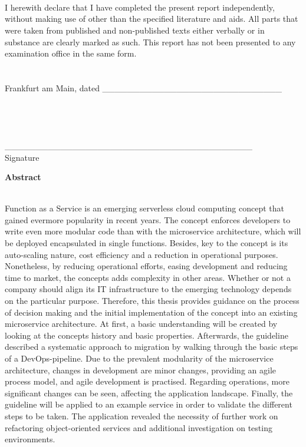 \documentclass[a4paper,11pt, pagesize]{scrartcl}
\begin{document}
\begin{spacing}{1.2}
\begin{flushleft}
\end{flushleft}
~\\\\\\
I herewith declare that I have completed the present report independently, without making use of other than the specified literature and aids. All parts that were taken from published and non-published texts either verbally or in substance are clearly marked as such.  This report has not been presented to any examination office in the same form.  \\\\\\
Frankfurt am Main, dated  \_\_\_\_\_\_\_\_\_\_\_\_\_\_\_\_\_\_\_\_\_\_\_\_\_\_\_\_\_    
\\\\\\\\\\
\_\_\_\_\_\_\_\_\_\_\_\_\_\_\_\_\_\_\_\_\_\_\_\_\_\_\_\_\_\_\_\_\_\_\_\_\_\_\_\_\\Signature 
\newpage
\begin{flushleft}
  {\Large \textbf {Abstract}}\\\\
\end{flushleft}
Function as a Service is an emerging serverless cloud computing concept that gained evermore popularity in recent years. The concept enforces developers to write even more modular code than with the microservice architecture, which will be deployed encapsulated in single functions. Besides, key to the concept is its auto-scaling nature, cost efficiency and a reduction in operational purposes. Nonetheless, by reducing operational efforts, easing development and reducing time to market, the concepts adds complexity in other areas. Whether or not a company should align its IT infrastructure to the emerging technology depends on the particular purpose. Therefore, this thesis provides guidance on the process of decision making and the initial implementation of the concept into an existing microservice architecture. At first, a basic understanding will be created by looking at the concepts history and basic properties. Afterwards, the guideline described a systematic approach to migration by walking through the basic steps of a DevOps-pipeline. Due to the prevalent modularity of the microservice architecture, changes in development are minor changes, providing an agile process model, and agile development is practised. Regarding operations, more significant changes can be seen, affecting the application landscape. Finally, the guideline will be applied to an example service in order to validate the different steps to be taken. The application revealed the necessity of further work on refactoring object-oriented services and additional investigation on testing environments.   

\end{spacing}
\end{document}
